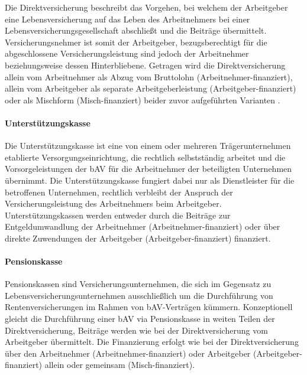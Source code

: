Die Direktversicherung beschreibt das Vorgehen, bei welchem der Arbeitgeber eine Lebensversicherung auf das Leben des Arbeitnehmers bei einer Lebensversicherungsgesellschaft abschließt und die Beiträge übermittelt. Versicherungsnehmer ist somit der Arbeitgeber, bezugsberechtigt für die abgeschlossene Versicherungsleistung sind jedoch der Arbeitnehmer beziehungsweise dessen Hinterbliebene. Getragen wird die Direktversicherung allein vom Arbeitnehmer als Abzug vom Bruttolohn (Arbeitnehmer-finanziert), allein vom Arbeitgeber als separate Arbeitgeberleistung (Arbeitgeber-finanziert) oder als Mischform (Misch-finanziert) beider zuvor aufgeführten Varianten \cite[S. 33]{plato2016betriebliche}.

\paragraph*{Unterstützungskasse}
Die Unterstützungskasse ist eine von einem oder mehreren Trägerunternehmen etablierte Versorgungseinrichtung, die rechtlich selbstständig arbeitet und die Vorsorgeleistungen der bAV für die Arbeitnehmer der beteiligten Unternehmen übernimmt. Die Unterstützungskasse fungiert dabei nur als Dienstleister für die betroffenen Unternehmen, rechtlich verbleibt der Anspruch der Versicherungsleistung des Arbeitnehmers beim Arbeitgeber. Unterstützungskassen werden entweder durch die Beiträge zur Entgeldumwandlung der Arbeitnehmer (Arbeitnehmer-finanziert) oder über direkte Zuwendungen der Arbeitgeber (Arbeitgeber-finanziert) finanziert. %

\paragraph*{Pensionskasse}

Pensionskassen sind Versicherungsunternehmen, die sich im Gegensatz zu Lebensversicherungsunternehmen ausschließlich um die Durchführung von Rentenversicherungen im Rahmen von bAV-Verträgen kümmern. Konzeptionell gleicht die Durchführung einer bAV via Pensionskasse in weiten Teilen der Direktversicherung, Beiträge werden wie bei der Direktversicherung vom Arbeitgeber übermittelt. Die Finanzierung erfolgt wie bei der Direktversicherung über den Arbeitnehmer (Arbeitnehmer-finanziert) oder Arbeitgeber (Arbeitgeber-finanziert) allein oder gemeinsam (Misch-finanziert). 

